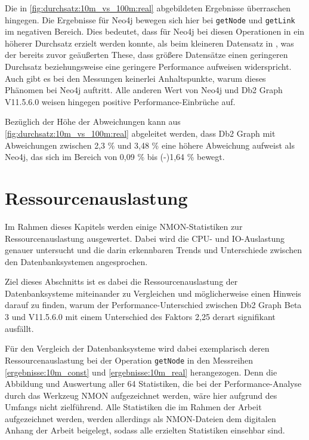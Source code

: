 Die in \autoref{fig:durchsatz:10m_vs_100m:real} abgebildeten Ergebnisse überraschen hingegen. Die Ergebnisse für Neo4j bewegen sich hier bei \texttt{getNode} und \texttt{getLink} im negativen Bereich. Dies bedeutet, dass für Neo4j bei diesen Operationen in  ein höherer Durchsatz erzielt werden konnte, als beim kleineren Datensatz in , was der bereits zuvor geäußerten These, dass größere Datensätze einen geringeren Durchsatz beziehungsweise eine geringere Performance aufweisen widerspricht. Auch gibt es bei den Messungen keinerlei Anhaltspunkte, warum dieses Phänomen bei Neo4j auftritt. Alle anderen Wert von Neo4j und Db2 Graph V11.5.6.0 weisen hingegen positive Performance-Einbrüche auf.

Bezüglich der Höhe der Abweichungen kann aus \autoref{fig:durchsatz:10m_vs_100m:real} abgeleitet werden, dass Db2 Graph mit Abweichungen zwischen 2,3 \% und 3,48 \% eine höhere Abweichung aufweist als Neo4j, das sich im Bereich von 0,09 \% bis (-)1,64 \% bewegt. 

\section{Ressourcenauslastung}
\label{auswertung:ressourcenauslastung}

Im Rahmen dieses Kapitels werden einige NMON-Statistiken zur Ressourcenauslastung ausgewertet. Dabei wird die CPU- und IO-Aus\-last\-ung genauer untersucht und die darin erkennbaren Trends und Unterschiede zwischen den Datenbanksystemen angesprochen. 

Ziel dieses Abschnitts ist es dabei die Ressourcenauslastung der Datenbanksysteme miteinander zu Vergleichen und möglicherweise einen Hinweis darauf zu finden, warum der Performance-Unterschied zwischen Db2 Graph Beta 3 und V11.5.6.0 mit einem Unterschied des Faktors 2,25 derart signifikant ausfällt. 

Für den Vergleich der Datenbanksysteme wird dabei exemplarisch deren Ressourcenauslastung bei der Operation \texttt{getNode} in den Messreihen \autoref{ergebnisse:10m_const} und \autoref{ergebnisse:10m_real} herangezogen. Denn die Abbildung und Auswertung aller 64 Statistiken, die bei der Performance-Analyse durch das Werkzeug NMON aufgezeichnet werden, wäre hier aufgrund des Umfangs nicht zielführend. Alle Statistiken die im Rahmen der Arbeit aufgezeichnet werden, werden allerdings als NMON-Dateien dem digitalen Anhang der Arbeit beigelegt, sodass alle erzielten Statistiken einsehbar sind.

